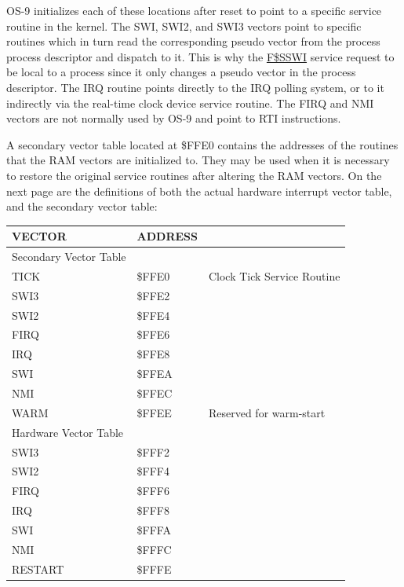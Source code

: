 \documentclass[
]{article}
\newcounter{none} %
\begin{document}
OS-9 initializes each of these locations after reset to point to a
specific service routine in the kernel. The SWI, SWI2, and SWI3 vectors
point to specific routines which in turn read the corresponding pseudo
vector from the process\textquotesingle{} process descriptor and
dispatch to it. This is why the \hyperref[f.sswi]{F\$SSWI} service
request to be local to a process since it only changes a pseudo vector
in the process descriptor. The IRQ routine points directly to the IRQ
polling system, or to it indirectly via the real-time clock device
service routine. The FIRQ and NMI vectors are not normally used by OS-9
and point to RTI instructions.

A secondary vector table located at \$FFE0 contains the addresses of the
routines that the RAM vectors are initialized to. They may be used when
it is necessary to restore the original service routines after altering
the RAM vectors. On the next page are the definitions of both the actual
hardware interrupt vector table, and the secondary vector table:

{\def\LTcaptype{none} %
\begin{longtable}[]{@{}
  >{\raggedright\arraybackslash}p{}
  >{\raggedright\arraybackslash}p{}
  >{\raggedright\arraybackslash}p{}@{}}
\toprule\noalign{}
\begin{minipage}[b]{\linewidth}\raggedright
VECTOR
\end{minipage} & \begin{minipage}[b]{\linewidth}\raggedright
ADDRESS
\end{minipage} & \begin{minipage}[b]{\linewidth}\raggedright
\end{minipage} \\
\midrule\noalign{}
\endhead
\bottomrule\noalign{}
\endlastfoot
Secondary Vector Table & & \\
TICK & \$FFE0 & Clock Tick Service Routine \\
SWI3 & \$FFE2 & \\
SWI2 & \$FFE4 & \\
FIRQ & \$FFE6 & \\
IRQ & \$FFE8 & \\
SWI & \$FFEA & \\
NMI & \$FFEC & \\
WARM & \$FFEE & Reserved for warm-start \\
Hardware Vector Table & & \\
SWI3 & \$FFF2 & \\
SWI2 & \$FFF4 & \\
FIRQ & \$FFF6 & \\
IRQ & \$FFF8 & \\
SWI & \$FFFA & \\
NMI & \$FFFC & \\
RESTART & \$FFFE & \\
\end{longtable}
}
\end{document}
